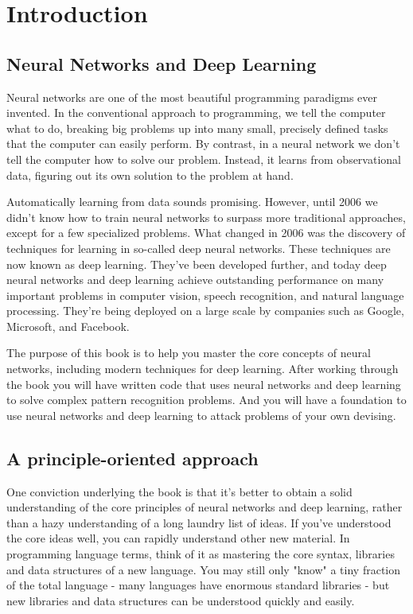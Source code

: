 \documentclass[a4paper,12pt]{report}%
\begin{document}
\chapter{\color{IAF} \bf Introduction}
\section{Neural Networks and Deep Learning}
Neural networks are one of the most beautiful programming paradigms ever invented. In the conventional approach to programming, we tell the computer what to do, breaking big problems up into many small, precisely defined tasks that the computer can easily perform. By contrast, in a neural network we don't tell the computer how to solve our problem. Instead, it learns from observational data, figuring out its own solution to the problem at hand.

Automatically learning from data sounds promising. However, until 2006 we didn't know how to train neural networks to surpass more traditional approaches, except for a few specialized problems. What changed in 2006 was the discovery of techniques for learning in so-called deep neural networks. These techniques are now known as deep learning. They've been developed further, and today deep neural networks and deep learning achieve outstanding performance on many important problems in computer vision, speech recognition, and natural language processing. They're being deployed on a large scale by companies such as Google, Microsoft, and Facebook.

The purpose of this book is to help you master the core concepts of neural networks, including modern techniques for deep learning. After working through the book you will have written code that uses neural networks and deep learning to solve complex pattern recognition problems. And you will have a foundation to use neural networks and deep learning to attack problems of your own devising.

\section{A principle-oriented approach}
One conviction underlying the book is that it's better to obtain a solid understanding of the core principles of neural networks and deep learning, rather than a hazy understanding of a long laundry list of ideas. If you've understood the core ideas well, you can rapidly understand other new material. In programming language terms, think of it as mastering the core syntax, libraries and data structures of a new language. You may still only "know" a tiny fraction of the total language - many languages have enormous standard libraries - but new libraries and data structures can be understood quickly and easily.
\end{document}
